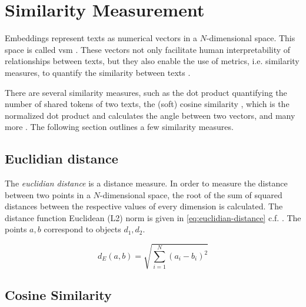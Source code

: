 
\section{Similarity Measurement}\label{sec:similarity-measurement}

Embeddings represent texts as numerical vectors in a $N$-dimensional space.
This space is called \ac{vsm} \cite{soft_cosine2014}.
These vectors not only facilitate human interpretability of relationships between texts, 
but they also enable the use of metrics, i.e. similarity measures, to quantify the similarity between texts \cite{IR2011, euclidean_l2_norm2015}.

There are several similarity measures, such as the dot product quantifying the number of shared tokens of two texts, 
the (soft) cosine similarity \cite{soft_cosine2014, soft_cosine2017}, which is the normalized dot product and calculates the angle between two vectors, 
and many more \cite{IR2011, euclidean_l2_norm2015, HfsentTrans2019}.
The following section outlines a few similarity measures.


\subsection{Euclidian distance}\label{subsec:euclidian-distance}

The \textit{euclidian distance} is a distance measure.
In order to measure the distance between two points in a $N$-dimensional space, 
the root of the sum of squared distances between the respective values of every dimension is calculated.
The distance function Euclidean (L2) norm is given in \autoref{eq:euclidian-distance} c.f. \cite{euclidean_l2_norm2015}.
The points $a, b$ correspond to objects $d_1, d_2$.

\begin{equation}
    d_E(a,b) = \sqrt{\sum_{i=1}^{N}(a_i - b_i)^2}
    \label{eq:euclidian-distance}
\end{equation}


\subsection{Cosine Similarity}\label{subsec:cosine-similarity}


